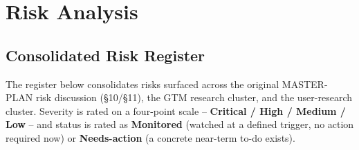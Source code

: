 \chapter{Risk Analysis}
\label{chap:risk-analysis}

\section{Consolidated Risk Register}
\label{sec:risk-register}

The register below consolidates risks surfaced across the original MASTER-PLAN risk discussion (\S10/\S11), the GTM research cluster, and the user-research cluster. Severity is rated on a four-point scale -- \textbf{Critical / High / Medium / Low} -- and status is rated as \textbf{Monitored} (watched at a defined trigger, no action required now) or \textbf{Needs-action} (a concrete near-term to-do exists).

